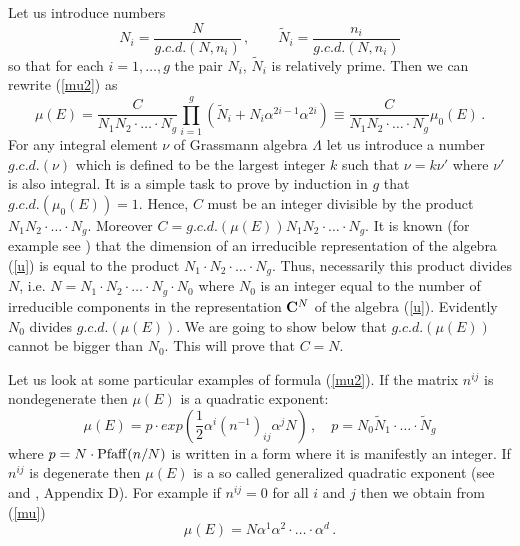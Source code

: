 \documentclass[a4paper,a4paper]{article}
\begin{document}
Let us introduce  numbers
$$
N_{i} = \frac{N}{g.c.d. (N, n_{i})} \, , \qquad \tilde N_{i} = \frac{n_{i}}{g.c.d. (N, n_{i})}
$$
so that for each $i=1, \dots , g$ the pair   $N_{i}$, $\tilde N_{i}$ is relatively prime.
Then we can rewrite (\ref{mu2}) as 
\begin{equation} \label{mu3} 
\mu(E) = \frac{C}{N_{1}N_{2}\cdot \dots \cdot N_{g}} \prod_{i=1}^{g} (\tilde N_{i} + N_{i}\alpha^{2i-1}\alpha^{2i}) \equiv 
\frac{C}{N_{1}N_{2}\cdot  \dots \cdot N_{g}}\mu_{0}(E) \, .
\end{equation}
For any integral element $\nu$ of Grassmann algebra $\Lambda$ let us introduce a number $g.c.d. (\nu)$ which is 
defined to be  the largest integer $k$ such that  $\nu = k\nu'$ where 
$\nu'$ is also integral.   
It is a simple task to prove by induction in $g$ that  $g.c.d. (\mu_{0}(E))=1$. 
Hence, $C$ must be an integer divisible by the product $N_{1}N_{2}\cdot \dots \cdot N_{g}$. Moreover 
 $C = g.c.d. (\mu(E) )N_{1}N_{2}\cdot \dots \cdot N_{g}$.  
It is known (for example see \cite{vanBaal})  that the dimension of  an irreducible representation of the algebra (\ref{u}) is equal to 
the product $N_{1}\cdot N_{2} \cdot \dots \cdot N_{g}$. 
Thus,  necessarily this product divides $N$, i.e. $N =  N_{1}\cdot N_{2} \cdot \dots \cdot N_{g}\cdot N_{0}$ 
where $N_{0}$ is an integer equal to the  number of  irreducible components in the  
representation ${\bf C}^{N}$ of the algebra (\ref{u}). 
Evidently $N_{0}$ divides $g.c.d.(\mu(E))$. We are going to show below that  $g.c.d.(\mu(E))$ cannot be bigger than $N_{0}$.
This will prove that $C=N$.


Let us look at some particular examples of formula (\ref{mu2}). 
 If the matrix $n^{ij}$ is nondegenerate then $\mu(E)$ is a quadratic exponent:
\begin{equation}
\mu(E) = p\cdot exp( \frac{1}{2}\alpha^{i}(n^{-1})_{ij} \alpha^{j} N) \, , \quad p=N_{0}\tilde N_{1}\cdot \dots \cdot \tilde N_{g} 
\end{equation} 
where $p=N\cdot {\rm Pfaff}(n/N)$ is written in a form where it is manifestly an integer.  
If $n^{ij}$ is degenerate then $\mu(E)$ is a so called generalized quadratic exponent (see \cite{AstSchw} and \cite{KS}, Appendix D). 
For example if $n^{ij}=0$ for all $i$ and $j$ then we obtain from (\ref{mu}) 
\begin{equation}
\mu(E) = N \alpha^{1}\alpha^{2}\cdot \dots \cdot \alpha^{d} \, .
\end{equation}

            
\end{document}

